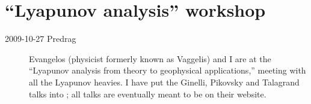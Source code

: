 \section{``Lyapunov analysis'' workshop}
\label{iscpif}

\begin{description}

\item[2009-10-27 Predrag] Evangelos (physicist formerly known
as Vaggelis) and I are at the ``Lyapunov analysis from theory
to geophysical applications,''
 meeting with
all the Lyapunov heavies. I have put the Ginelli, Pikovsky and
Talagrand talks into ; all talks are eventually
meant to be on their website.
\end{description}

